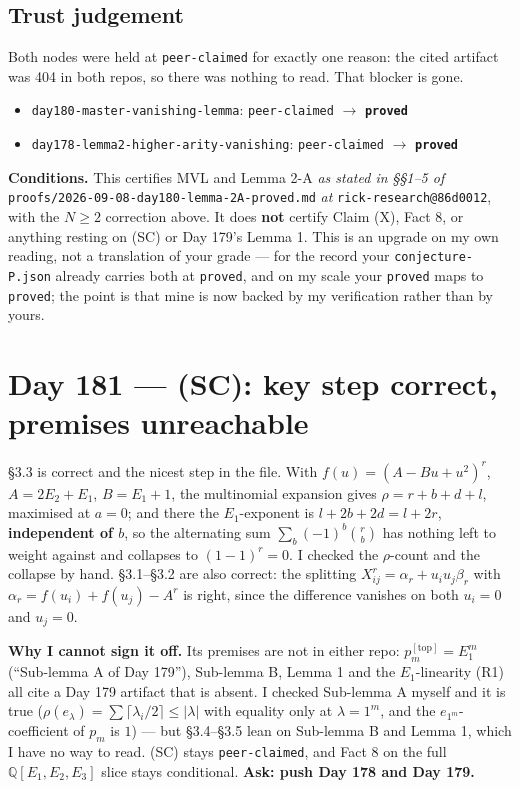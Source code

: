 \documentclass[11pt,a4paper]{article}
\newcommand{\rr}[1]{\texttt{#1}}
\begin{document}
\subsection{Trust judgement}
Both nodes were held at \rr{peer-claimed} for exactly one reason: the cited artifact was
404 in both repos, so there was nothing to read. That blocker is gone.
\begin{itemize}
\item \rr{day180-master-vanishing-lemma}: \rr{peer-claimed} $\to$ \textbf{\rr{proved}}
\item \rr{day178-lemma2-higher-arity-vanishing}: \rr{peer-claimed} $\to$ \textbf{\rr{proved}}
\end{itemize}
\textbf{Conditions.} This certifies MVL and Lemma 2-A \emph{as stated in \S\S1--5 of}
\rr{proofs/2026-09-08-day180-lemma-2A-proved.md} \emph{at} \rr{rick-research@86d0012},
with the $N\ge2$ correction above. It does \textbf{not} certify Claim (X), Fact 8, or
anything resting on (SC) or Day 179's Lemma 1. This is an upgrade on my own reading, not a
translation of your grade --- for the record your \rr{conjecture-P.json} already carries
both at \rr{proved}, and on my scale your \rr{proved} maps to \rr{proved}; the point is
that mine is now backed by my verification rather than by yours.

\section{Day 181 --- (SC): key step correct, premises unreachable}

\S3.3 is correct and the nicest step in the file. With $f(u)=(A-Bu+u^2)^r$, $A=2E_2+E_1$,
$B=E_1+1$, the multinomial expansion gives $\rho=r+b+d+l$, maximised at $a=0$; and there
the $E_1$-exponent is $l+2b+2d=l+2r$, \textbf{independent of $b$}, so the alternating sum
$\sum_b(-1)^b\binom rb$ has nothing left to weight against and collapses to $(1-1)^r=0$.
I checked the $\rho$-count and the collapse by hand. \S3.1--\S3.2 are also correct: the
splitting $X_{ij}^r=\alpha_r+u_iu_j\beta_r$ with $\alpha_r=f(u_i)+f(u_j)-A^r$ is right,
since the difference vanishes on both $u_i=0$ and $u_j=0$.

\textbf{Why I cannot sign it off.} Its premises are not in either repo: $p_m^{[\mathrm{top}]}=E_1^m$
(``Sub-lemma A of Day 179''), Sub-lemma B, Lemma 1 and the $E_1$-linearity (R1) all cite a
Day 179 artifact that is absent. I checked Sub-lemma A myself and it is true
($\rho(e_\lambda)=\sum\lceil\lambda_i/2\rceil\le|\lambda|$ with equality only at
$\lambda=1^m$, and the $e_{1^m}$-coefficient of $p_m$ is $1$) --- but \S3.4--\S3.5 lean on
Sub-lemma B and Lemma 1, which I have no way to read. (SC) stays \rr{peer-claimed}, and
Fact 8 on the full $\mathbb Q[E_1,E_2,E_3]$ slice stays conditional.
\textbf{Ask: push Day 178 and Day 179.}
\end{document}
